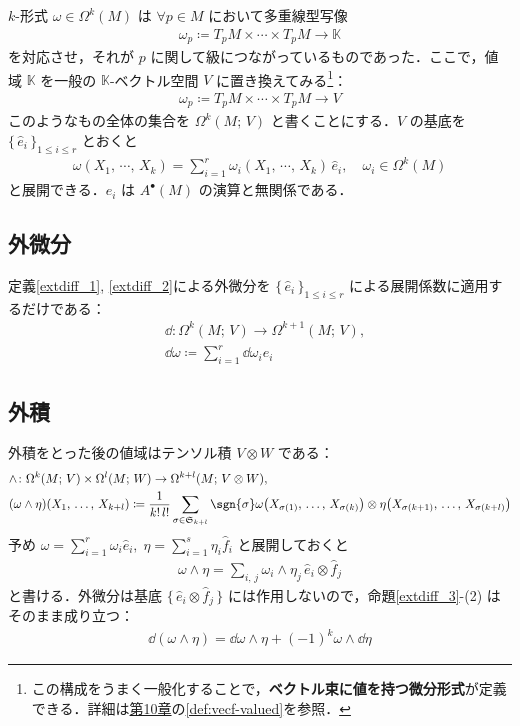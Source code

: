 \documentclass[geometry_main]{subfiles}
\begin{document}
$k$-形式 $\omega \in \Omega^k(M)$ は $\forall p \in M$ において多重線型写像
\begin{align}
	\omega_p \coloneqq T_pM \times \cdots  \times T_pM \to \mathbb{K}
\end{align}
を対応させ，それが $p$ に関して\cinfty 級につながっているものであった．ここで，値域 $\mathbb{K}$ を一般の $\mathbb{K}$-ベクトル空間 $V$ に置き換えてみる\footnote{この構成をうまく一般化することで，\textbf{ベクトル束に値を持つ微分形式}が定義できる．詳細は\hyperref[chap10]{第10章}の\eqref{def:vecf-valued}を参照．}：
\begin{align}
	\omega_p \coloneqq T_pM \times \cdots  \times T_pM \to V
\end{align}
このようなもの全体の集合を $\Omega^k(M;\, V)$ と書くことにする．$V$ の基底を $\{\, \hat{e}_i\, \}_{1\le i \le r}$ とおくと
\begin{align}
	\omega(X_1,\, \cdots ,\, X_k) = \sum_{i=1}^r \omega_i(X_1,\, \cdots ,\, X_k)\, \hat{e}_i, \quad \omega_i \in \Omega^k(M)
\end{align}
と展開できる．$\hat{e}_i$ は $A^\bullet(M)$ の演算と無関係である．

\subsection{外微分}

定義\ref{extdiff_1}, \ref{extdiff_2}による外微分を $\{\, \hat{e}_i\, \}_{1\le i \le r}$ による展開係数に適用するだけである：
\begin{align}
	&\dd{} \colon \Omega^k(M;\, V) \to \Omega^{k+1}(M;\, V),\\
	&\dd{\omega} \coloneqq \sum_{i=1}^r \dd{\omega_i} \hat{e}_i
\end{align}

\subsection{外積}

外積をとった後の値域はテンソル積 $V \otimes W$ である：
\begin{align}
	&\wedge \colon \Omega^k(M;\, V) \times \Omega^l(M;\, W) \to \Omega^{k+l}(M;\, V \otimes W),\\
	&(\omega \wedge \eta)(X_1,\, \dots ,\, X_{k+l}) \coloneqq \frac{1}{k!\, l!}\sum_{\sigma \in \mathfrak{S}_{k+l}} \sgn{\sigma} \omega\bigl(X_{\sigma(1)},\, \dots ,\, X_{\sigma(k)}\bigr) \otimes \eta\bigl(X_{\sigma(k+1)},\, \dots ,\, X_{\sigma(k+l)}\bigr)
\end{align}
予め $\omega = \sum_{i=1}^r \omega_i \hat{e}_i,\; \eta = \sum_{i=1}^s \eta_i \hat{f}_i$ と展開しておくと
\begin{align}
	\omega \wedge \eta = \sum_{i,\, j} \omega_i \wedge \eta_j\, \hat{e}_i \otimes \hat{f}_j
\end{align}
と書ける．外微分は基底 $\{\, \hat{e}_i \otimes \hat{f}_j\, \}$ には作用しないので，命題\ref{extdiff_3}-(2) はそのまま成り立つ：
\begin{align}
	\dd{(\omega \wedge \eta)} = \dd{\omega} \wedge \eta + (-1)^k \omega \wedge \dd{\eta}
\end{align}
\end{document}
